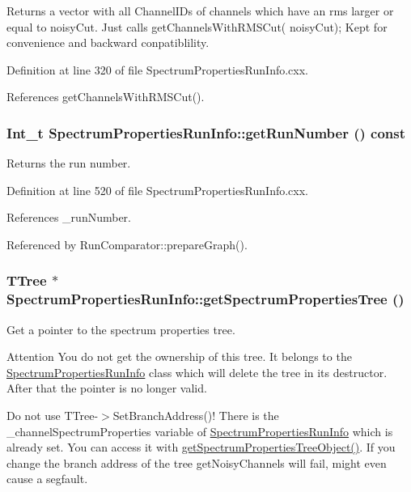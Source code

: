Returns a vector with all ChannelIDs of channels which have an rms larger or equal to {\ttfamily noisyCut}. Just calls getChannelsWithRMSCut( noisyCut); Kept for convenience and backward conpatiblility. 

Definition at line 320 of file SpectrumPropertiesRunInfo.cxx.

References getChannelsWithRMSCut().\hypertarget{class_spectrum_properties_run_info_a54c0276d0cfdda159644c833ef35a492}{
\subsubsection[{getRunNumber}]{\setlength{\rightskip}{0pt plus 5cm}Int\_\-t SpectrumPropertiesRunInfo::getRunNumber () const}}
\label{class_spectrum_properties_run_info_a54c0276d0cfdda159644c833ef35a492}


Returns the run number. 

Definition at line 520 of file SpectrumPropertiesRunInfo.cxx.

References \_\-runNumber.

Referenced by RunComparator::prepareGraph().\hypertarget{class_spectrum_properties_run_info_aca0dfbac309a9619d04ce536855a89a2}{
\subsubsection[{getSpectrumPropertiesTree}]{\setlength{\rightskip}{0pt plus 5cm}TTree $\ast$ SpectrumPropertiesRunInfo::getSpectrumPropertiesTree ()}}
\label{class_spectrum_properties_run_info_aca0dfbac309a9619d04ce536855a89a2}


Get a pointer to the spectrum properties tree. \begin{DoxyAttention}{Attention}
You do not get the ownership of this tree. It belongs to the \hyperlink{class_spectrum_properties_run_info}{SpectrumPropertiesRunInfo} class which will delete the tree in its destructor. After that the pointer is no longer valid.

Do not use TTree-\/$>$SetBranchAddress()! There is the \_\-channelSpectrumProperties variable of \hyperlink{class_spectrum_properties_run_info}{SpectrumPropertiesRunInfo} which is already set. You can access it with \hyperlink{class_spectrum_properties_run_info_a13a12de80cf8fce594345616da473856}{getSpectrumPropertiesTreeObject()}. If you change the branch address of the tree getNoisyChannels will fail, might even cause a segfault. 
\end{DoxyAttention}



